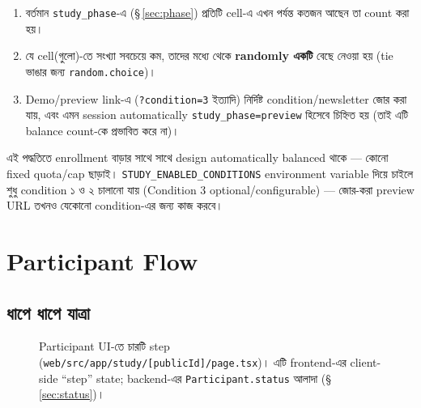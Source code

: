\documentclass[11pt,a4paper]{article}
\newcommand{\code}[1]{\texttt{\small #1}}
\newcommand{\file}[1]{\texttt{\small #1}}
\begin{document}
\begin{enumerate}
\item বর্তমান \code{study\_phase}-এ (\S\,\ref{sec:phase}) প্রতিটি cell-এ এখন পর্যন্ত কতজন
  আছেন তা count করা হয়।
\item যে cell(গুলো)-তে সংখ্যা সবচেয়ে কম, তাদের মধ্যে থেকে \textbf{randomly একটি} বেছে নেওয়া
  হয় (tie ভাঙার জন্য \code{random.choice})।
\item Demo/preview link-এ (\code{?condition=3} ইত্যাদি) নির্দিষ্ট condition/newsletter জোর
  করা যায়, এবং এমন session automatically \code{study\_phase=preview} হিসেবে চিহ্নিত হয়
  (তাই এটি balance count-কে প্রভাবিত করে না)।
\end{enumerate}

এই পদ্ধতিতে enrollment বাড়ার সাথে সাথে design automatically balanced থাকে --- কোনো fixed
quota/cap ছাড়াই। \code{STUDY\_ENABLED\_CONDITIONS} environment variable দিয়ে চাইলে শুধু
condition ১ ও ২ চালানো যায় (Condition 3 optional/configurable) --- জোর-করা preview URL
তখনও যেকোনো condition-এর জন্য কাজ করবে।

\newpage
\section{Participant Flow}
\label{sec:flow}

\subsection{ধাপে ধাপে যাত্রা}

\begin{figure}[H]
\centering
{}
\caption{Participant UI-তে চারটি step (\file{web/src/app/study/[publicId]/page.tsx})। এটি
frontend-এর client-side ``step'' state; backend-এর \code{Participant.status} আলাদা
(\S\,\ref{sec:status})।}
\end{figure}
\end{document}
